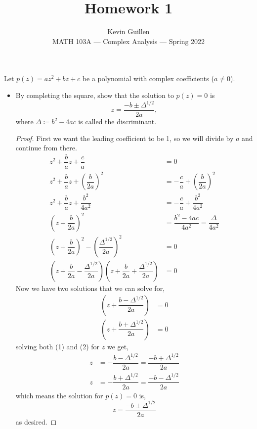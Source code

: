 \documentclass[11pt]{article}
\newenvironment{problem}[2][Problem\!]{\begin{trivlist}
\item[\hskip \labelsep {\bfseries #1}\hskip \labelsep {\bfseries #2.}]}{\end{trivlist}}
\newcommand{\lrp}[1]{\left(#1\right)}
\begin{document}
 
\title{Homework 1}
\author{Kevin Guillen\\[0.5em]
MATH 103A --- Complex Analysis --- Spring 2022}
\date{} 
\maketitle


\begin{problem}{1.1}
Let $p(z) = az^2 + bz + c$ be a polynomial with complex coefficients ($a\neq 0$). 
\begin{itemize}[itemsep=2em]
\item[(a)] By completing the square, show that the solution to $p(z) = 0$ is
\[z = \frac{-b \pm \Delta^{1/2}}{2a},\]
where $\Delta \coloneqq b^2 - 4ac$ is called the discriminant.
\begin{example}
\begin{proof}
    First we want the leading coefficient to be 1, so we will divide by $a$ and continue from there.
    \begin{align*}
        z^{2} + \dfrac{b}{a}z + \dfrac{c}{a} &= 0 \\[.25em]
        z^{2} + \dfrac{b}{a}z + \lrp{\dfrac{b}{2a}}^{2} &= -\dfrac{c}{a} + \lrp{\dfrac{b}{2a}}^{2} \\[.25em]
        z^{2} + \dfrac{b}{a}z + \dfrac{b^{2}}{4a^{2}} &= -\dfrac{c}{a} + \dfrac{b^{2}}{4a^{2}} \\[.25em]
        \lrp{z + \dfrac{b}{2a}}^{2}&= \dfrac{b^{2} -4ac}{4a^{2}} = \dfrac{\Delta}{4a^{2}} \\
        \lrp{z + \dfrac{b}{2a}}^{2} - \lrp{\dfrac{\Delta^{1/2}}{2a}}^{2} &= 0 \\
        \lrp{z + \dfrac{b}{2a} - \dfrac{\Delta^{1/2}}{2a}} \lrp{z + \dfrac{b}{2a} + \dfrac{\Delta^{1/2}}{2a}} &= 0
    \end{align*}
    Now we have two solutions that we can solve for,
    \begin{align}
        \lrp{z + \dfrac{b - \Delta^{1/2}}{2a}} &= 0 \\
        \lrp{z +  \dfrac{b + \Delta^{1/2}}{2a}} &= 0
    \end{align}
    solving both (1) and (2) for $z$ we get,
    \begin{align*}
        z  & =  - \dfrac{b - \Delta^{1/2}}{2a} = \dfrac{-b + \Delta^{1/2}}{2a} \\
        z & = -  \dfrac{b + \Delta^{1/2}}{2a} =   \dfrac{-b - \Delta^{1/2}}{2a}
    \end{align*}
    which means the solution for $p(z) = 0$ is,
    \[z =  \dfrac{-b \pm \Delta^{1/2}}{2a}\]
    as desired. 
\end{proof} 


\end{example}
\end{itemize}
\end{problem}
\end{document}

